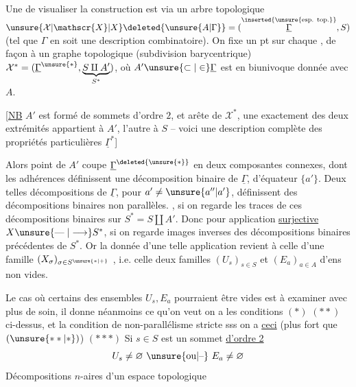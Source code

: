Une  de visualiser la construction est via un arbre topologique $\unsure{\mathcal{X}|\mathscr{X}|X}\deleted{\unsure{A|\Gamma}}=(\overset{\text{\inserted{\unsure{esp. top.}}}}{\underline{\Gamma}},S)$ (tel que $\Gamma$ en soit une description combinatoire). On fixe un pt sur
chaque , de façon à  un graphe topologique (subdivision barycentrique) $\mathcal{X}^{\ast}=(\underline{\Gamma}^{\unsure{\ast}},\underbrace{S\amalg A'}_{S^{\ast}})$, où $A'\unsure{\subset|\in}\underline{\Gamma}$ est en  biunivoque donnée avec  $A$.

 [\uline{NB} $A'$ est formé de  sommets d'ordre $2$, et   arête de $\mathcal{X}^{\ast}$, une exactement des deux extrémités appartient à $A'$, l'autre à $S$ -- voici une description complète des propriétés particulières  $\underline{\Gamma}^{\ast}$]

Alors  point  de $A'$ coupe $\underline{\Gamma}^{\deleted{\unsure{\ast}}}$ en deux composantes connexes, dont les adhérences définissent une décomposition binaire de $\underline{\Gamma}$, d'équateur $\{a'\}$. Deux
telles décompositions  de $\underline{\Gamma}$, pour $a'\ne\unsure{a''|a'}$, définissent des décompositions binaires  non parallèles.
, si on regarde les traces de ces décompositions binaires sur $S^\ast=S\amalg A'$. Donc pour  application \uline{surjective} $X\unsure{\mathrel{\text{---}}|\longrightarrow}S^\ast$, si on regarde  images
inverses des décompositions binaires précédentes de $S^\ast$. Or la donnée d'une telle application\unsure{,} revient à celle d'une famille $(X_\sigma)_{\sigma\in S^{\unsure{\ast|+}}}$ , i.e.  celle
 deux familles $(U_s)_{s\in S}$ et $(E_a)_{a\in A}$ d'ens non vides.

Le cas où certains des ensembles $U_s,E_a$ pourraient être vides est à examiner avec plus de soin, il donne néanmoins ce qu'on veut  on a les conditions $(\ast)$ $(\ast\ast)$ ci-dessus, et la condition de
non-parallélisme stricte sss on a \uline{ceci} (plus fort que $(\unsure{\ast\ast|\ast})$)
$(\ast\ast\ast)$ Si $s\in S$ est un sommet \uline{d'ordre 2}    
\[
U_s\ne\varnothing\ \unsure{\text{ou}|\text{--}}\ E_a\ne\varnothing
\]
\begingroup
\makeatletter\tagsleft@true\makeatother
\noindent Décompositions $n$-aires d'un espace topologique

